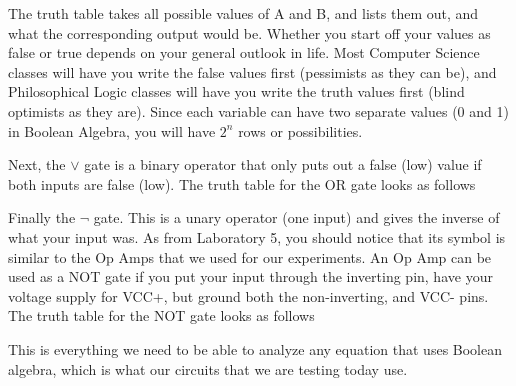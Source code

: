 \documentclass[%
 aip,
 jmp,
 amsmath,
 amssymb,
 reprint,%
 numerical,
 longbibliography,
]{revtex4-1}
\begin{document}
The truth table takes all possible values of A and B, and lists them out, and what the corresponding output
would be. Whether you start off your values as false or true depends on your general outlook in life. Most
Computer Science classes will have you write the false values first (pessimists as they can be), and Philosophical
Logic classes will have you write the truth values first (blind optimists as they are). Since each variable can have
two separate values (0 and 1) in Boolean Algebra, you will have $2^n$ rows or possibilities.

Next, the $\lor$ gate is a binary operator that only puts out a false (low) value if both inputs are
false (low). The truth table for the OR gate looks as follows



Finally the $\neg$ gate. This is a unary operator (one input) and gives the inverse of what your
input was. As from Laboratory 5, you should notice that its symbol is similar to the Op Amps that
we used for our experiments. An Op Amp can be used as a NOT gate if you put your input through the
inverting pin, have your voltage supply for VCC+, but ground both the non-inverting, and VCC- pins.
The truth table for the NOT gate looks as follows


This is everything we need to be able to analyze any equation that uses Boolean algebra, which is what
our circuits that we are testing today use.
\end{document}
